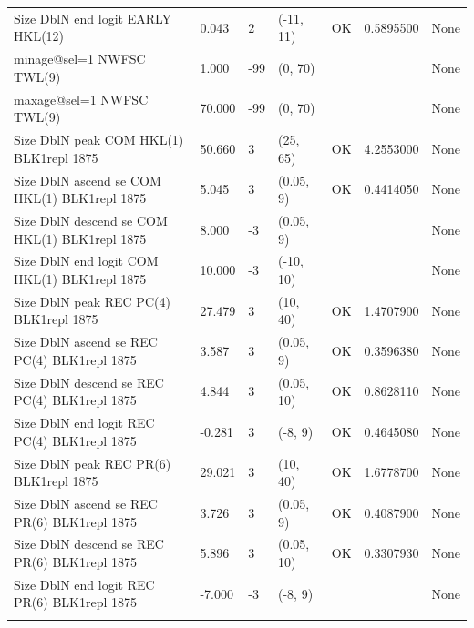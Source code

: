 \documentclass[11pt,
  english,
  a4paper,
]{article}
\begin{document}
\begin{landscape}
\begin{longtable}[t]{>{\raggedright\arraybackslash}p{8.5cm}lllll>{\raggedright\arraybackslash}p{4cm}}
Size DblN end logit EARLY HKL(12) & 0.043 & 2 & (-11, 11) & OK & 0.5895500 & None\\
minage@sel=1 NWFSC TWL(9) & 1.000 & -99 & (0, 70) &  &  & None\\
maxage@sel=1 NWFSC TWL(9) & 70.000 & -99 & (0, 70) &  &  & None\\
Size DblN peak COM HKL(1) BLK1repl 1875 & 50.660 & 3 & (25, 65) & OK & 4.2553000 & None\\
Size DblN ascend se COM HKL(1) BLK1repl 1875 & 5.045 & 3 & (0.05, 9) & OK & 0.4414050 & None\\
Size DblN descend se COM HKL(1) BLK1repl 1875 & 8.000 & -3 & (0.05, 9) &  &  & None\\
Size DblN end logit COM HKL(1) BLK1repl 1875 & 10.000 & -3 & (-10, 10) &  &  & None\\
Size DblN peak REC PC(4) BLK1repl 1875 & 27.479 & 3 & (10, 40) & OK & 1.4707900 & None\\
Size DblN ascend se REC PC(4) BLK1repl 1875 & 3.587 & 3 & (0.05, 9) & OK & 0.3596380 & None\\
Size DblN descend se REC PC(4) BLK1repl 1875 & 4.844 & 3 & (0.05, 10) & OK & 0.8628110 & None\\
Size DblN end logit REC PC(4) BLK1repl 1875 & -0.281 & 3 & (-8, 9) & OK & 0.4645080 & None\\
Size DblN peak REC PR(6) BLK1repl 1875 & 29.021 & 3 & (10, 40) & OK & 1.6778700 & None\\
Size DblN ascend se REC PR(6) BLK1repl 1875 & 3.726 & 3 & (0.05, 9) & OK & 0.4087900 & None\\
Size DblN descend se REC PR(6) BLK1repl 1875 & 5.896 & 3 & (0.05, 10) & OK & 0.3307930 & None\\
Size DblN end logit REC PR(6) BLK1repl 1875 & -7.000 & -3 & (-8, 9) &  &  & None\\*
\end{longtable}
\leavevmode\tagmcend\tagstructend\par
\endgroup{}
\end{landscape}
\endgroup{}
\end{document}
